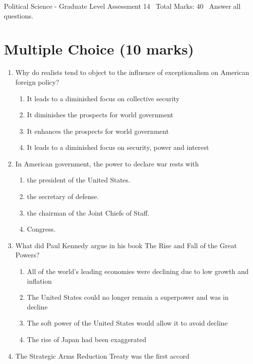 \documentclass[12pt]{article}
\begin{document}
\begin{center}
Political Science - Graduate Level Assessment 14 \
Total Marks: 40 \
Answer all questions.
\end{center}

\section*{Multiple Choice (10 marks)}
\begin{enumerate}[label=\arabic*.]
\item Why do realists tend to object to the influence of exceptionalism on American foreign policy?
\begin{enumerate}[label=(\alph*)]
    \item It leads to a diminished focus on collective security
    \item It diminishes the prospects for world government
    \item It enhances the prospects for world government
    \item It leads to a diminished focus on security, power and interest
\end{enumerate}
\item In American government, the power to declare war rests with
\begin{enumerate}[label=(\alph*)]
    \item the president of the United States.
    \item the secretary of defense.
    \item the chairman of the Joint Chiefs of Staff.
    \item Congress.
\end{enumerate}
\item What did Paul Kennedy argue in his book The Rise and Fall of the Great Powers?
\begin{enumerate}[label=(\alph*)]
    \item All of the world's leading economies were declining due to low growth and inflation
    \item The United States could no longer remain a superpower and was in decline
    \item The soft power of the United States would allow it to avoid decline
    \item The rise of Japan had been exaggerated
\end{enumerate}
\item The Strategic Arms Reduction Treaty was the first accord
\begin{enumerate}[label=(\alph*)]

\end{enumerate}
\end{enumerate}
\end{document}
